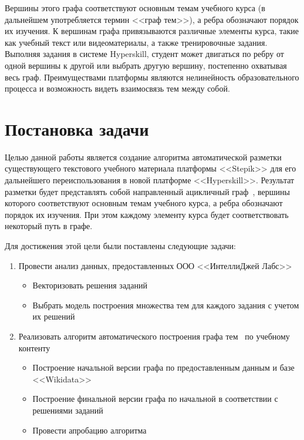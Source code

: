 \documentclass[14pt]{matmex-diploma-custom}
\begin{document}
Вершины этого графа соответствуют основным темам учебного курса (в дальнейшем употребляется термин <<граф тем>>), а ребра обозначают порядок их изучения. К вершинам графа привязываются различные элементы курса, такие как учебный текст или видеоматериалы, а также тренировочные задания. Выполняя задания в системе Hyperskill, студент может двигаться по ребру от одной вершины к другой или выбрать другую вершину, постепенно охватывая весь граф. Преимуществами платформы являются нелинейность образовательного процесса и возможность видеть взаимосвязь тем между собой.

\section{Постановка задачи}
Целью данной работы является создание алгоритма автоматической разметки существующего текстового учебного материала платформы <<Stepik>> для его дальнейшего переиспользования в новой платформе <<Hyperskill>>. Результат разметки будет представлять собой направленный ацикличный граф~\cite{cormen}, вершины которого соответствуют основным темам учебного курса, а ребра обозначают порядок их изучения. При этом каждому элементу курса будет соответствовать некоторый путь в графе.

Для достижения этой цели были поставлены следующие задачи: 

\begin{enumerate}
    \item Провести анализ данных, предоставленных ООО <<ИнтеллиДжей Лабс>>~\cite{jetbrains}
    \begin{itemize}
        \item Векторизовать решения заданий
        \item Выбрать модель построения множества тем для каждого задания с учетом их решений
    \end{itemize}
    \item Реализовать алгоритм автоматического построения графа тем~\cite{themegraph} по учебному контенту
    \begin{itemize}
        \item Построение начальной версии графа по предоставленным данным и базе <<Wikidata>>~\cite{wikidata}
        \item Построение финальной версии графа по начальной в соответствии с решениями заданий
    \item Провести апробацию алгоритма
    \end{itemize}
\end{enumerate}
\end{document}
